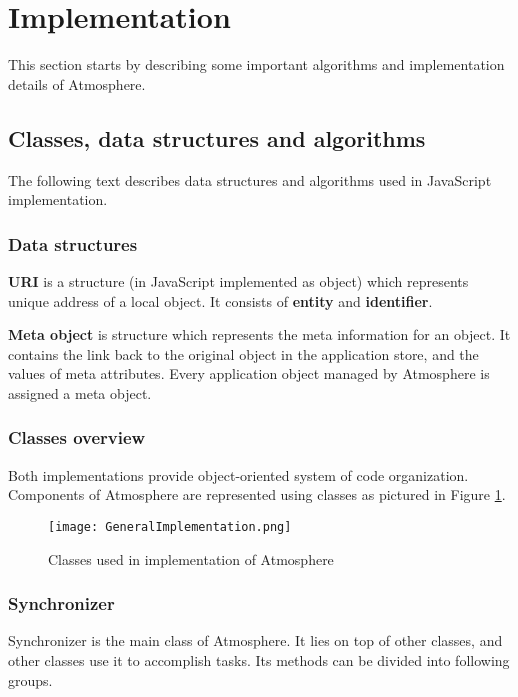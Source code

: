 \section{Implementation}

This section starts by describing some important algorithms and implementation details of Atmosphere.

\subsection{Classes, data structures and algorithms}

The following text describes data structures and algorithms used in JavaScript implementation.

\subsubsection{Data structures}

\textbf{URI} is a structure (in JavaScript implemented as object) which represents unique address of a local object. It consists of \textbf{entity} and \textbf{identifier}.

\textbf{Meta object} is structure which represents the meta information for an object. It contains the link back to the original object in the application store, and the values of meta attributes. Every application object managed by Atmosphere is assigned a meta object.

\subsubsection{Classes overview}

Both implementations provide object-oriented system of code organization. Components of Atmosphere are represented using classes as pictured in Figure \ref{fig:1}.

\begin{figure}[ht!]
\centering
\texttt{[image: GeneralImplementation.png]}
\caption{Classes used in implementation of Atmosphere \label{fig:1}}
\end{figure}


\subsubsection{Synchronizer}

Synchronizer is the main class of Atmosphere. It lies on top of other classes, and other classes use it to accomplish tasks. Its methods can be divided into following groups.

